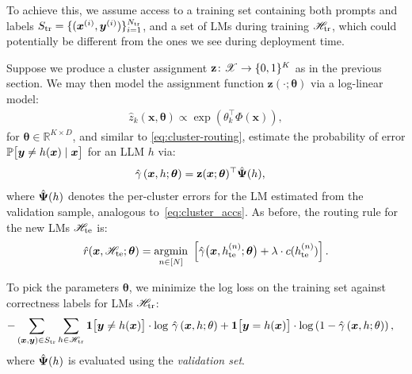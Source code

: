 To achieve this, we assume access to a training set containing both prompts and labels $S_{\textrm{tr}} = \{(\boldsymbol{x}^{(i)}, \boldsymbol{y}^{(i)})\}_{i=1}^{N_{\textrm{tr}}}$, and a set of  LMs during training $\mathscr{H}_{\textrm{tr}}$, %
which could potentially be different from the ones we see during deployment time.

Suppose we produce a cluster assignment $\mathbf{z} \colon \mathscr{X} \to \{ 0, 1 \}^K$ as in the previous section.
We may then model the assignment function 
$\mathbf{z}( \cdot; \boldsymbol{\theta} )$ %
via a log-linear model:
\begin{align*}
 \hat{z}_k( \boldsymbol{x}, \boldsymbol{\theta} ) \propto \exp\left(\theta_{k}^\top \Phi( \boldsymbol{x} ) \right),
\end{align*}
for $\boldsymbol{\theta} \in \mathbb{R}^{K\times D}$,
and similar to \eqref{eq:cluster-routing},
estimate the probability of error $\mathbb{P}\big[\boldsymbol{y} \ne h(\boldsymbol{x}) \mid \boldsymbol{x}\big]$ for an LLM $h$ via:
\begin{align*}
\hat{\gamma}\left( \bx, h; \boldsymbol{\theta} \right) 
&= \mathbf{z}( \bx; \boldsymbol{\theta} )^\top \hat{\LLMEmbed}( h ), %
\end{align*}
where $\hat{\boldsymbol{\Psi}}( h  )$ denotes the per-cluster errors for the LM estimated from the validation sample, analogous to~\eqref{eq:cluster_accs}.
As before,
the routing rule for the new LMs $\mathscr{H}_{\mathrm{te}}$ is:
\begin{equation}
    \hat{r}(\boldsymbol{x}, \mathscr{H}_{\mathrm{te}}; \boldsymbol{\theta} ) = \underset{n \in [ N ]}{\operatorname{argmin}}\,\, 
    \left[
    \hat{\gamma}\big( \boldsymbol{x}, h_{\mathrm{te}}^{(n)}; \boldsymbol{\theta} \big) + \lambda\cdot c( h_{\mathrm{te}}^{(n)} )
    \right].
    \label{eq:cluster-routing-learned}
\end{equation}

To pick the parameters $\boldsymbol{\theta}$, we minimize the log loss on the training set against correctness labels for LMs $\mathscr{H}_{\textrm{tr}}$: %
\begin{align*}
    -\sum_{(\boldsymbol{x}, \boldsymbol{y}) \in S_{\textrm{tr}}} &\sum_{h \in \mathscr{H}_{\textrm{tr}}}
        \bm{1}\big[ \boldsymbol{y} \ne h(\boldsymbol{x})\big] \cdot 
            \log\,\hat{\gamma} \left(
                    \boldsymbol{x}, h; \theta \right) 
            +
        \bm{1}\big[ \boldsymbol{y} = h(\boldsymbol{x})\big] \cdot 
            \log \left( 
                1 - \hat{\gamma}\left(
                    \boldsymbol{x}, h; \theta \right) 
                    \right), 
\end{align*}
where $\hat{\boldsymbol{\Psi}}( h )$ is evaluated using the \emph{validation set}. 





